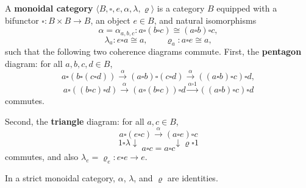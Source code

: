 A \textbf{monoidal category} $\langle B, \square, e, \alpha, \lambda, \varrho \rangle$ is a category $B$ equipped with a bifunctor $\square : B \times B \to B$, an object $e \in B$, and natural isomorphisms
$$\alpha = \alpha_{a,b,c} : a \square (b \square c) \cong (a \square b) \square c,$$
$$\lambda_a : e \square a \cong a, \qquad \varrho_a : a \square e \cong a,$$
such that the following two coherence diagrams commute.
First, the \textbf{pentagon} diagram: for all $a, b, c, d \in B$,
$$a \square (b \square (c \square d)) \xrightarrow{\alpha} (a \square b) \square (c \square d) \xrightarrow{\alpha} ((a \square b) \square c) \square d,$$
$$a \square ((b \square c) \square d) \xrightarrow{\alpha} (a \square (b \square c)) \square d \xrightarrow{\alpha \square 1} ((a \square b) \square c) \square d$$
commutes.

Second, the \textbf{triangle} diagram: for all $a, c \in B$,
$$a \square (e \square c) \xrightarrow{\alpha} (a \square e) \square c$$
$$1 \square \lambda \downarrow \qquad \qquad \downarrow \varrho \square 1$$
$$a \square c = a \square c$$
commutes, and also $\lambda_e = \varrho_e : e \square e \to e$.

In a strict monoidal category, $\alpha$, $\lambda$, and $\varrho$ are identities.
